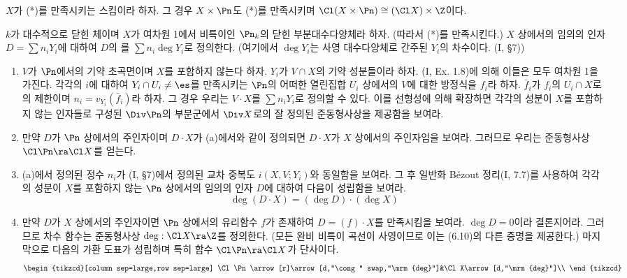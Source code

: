 	\begin{enumerate}[label=\tb{6.\arabic*.},itemindent=0mm,itemsep=2mm]
	\item $X$가 (*)를 만족시키는 스킴이라 하자. 그 경우 $X\times\Pn$도 (*)를 만족시키며 $\Cl(X\times\Pn)\cong(\Cl X)\times\Z$이다.
	{\renewcommand{\labelenumi}{\tb{*6.\arabic{enumi}.}}
	\item {} $k$가 대수적으로 닫힌 체이며
	$X$가 여차원 1에서 비특이인 $\Pn_k$의 닫힌 부분대수다양체라 하자. (따라서 (*)를 만족시킨다.)
	$X$ 상에서의 임의의 인자 $D=\sum n_iY_i$에 대하여 $D$의 를 $\sum n_i\deg Y_i$로 정의한다.
	(여기에서 $\deg Y_i$는 사영 대수다양체로 간주된 $Y_i$의 차수이다. (I, \S 7))
	\begin{enumerate}[label=(\alph*)]
	\item $V$가 $\Pn$에서의 기약 초곡면이며 $X$를 포함하지 않는다 하자. $Y_i$가 $V\cap X$의 기약 성분들이라 하자.
	(I, Ex. 1.8)에 의해 이들은 모두 여차원 1을 가진다.
	각각의 $i$에 대하여 $Y_i\cap U_i\ne\es$를 만족시키는 $\Pn$의 어떠한 열린집합 $U_i$ 상에서의 $V$에 대한 방정식을 $f_i$라 하자.
	$\bar f_i$가 $f_i$의 $U_i\cap X$로의 제한이며 $n_i=v_{Y_i}(\bar f_i)$라 하자.
	그 경우 우리는  $V\cdot X$를 $\sum n_iY_i$로 정의할 수 있다.
	이를 선형성에 의해 확장하면 각각의 성분이 $X$를 포함하지 않는 인자들로 구성된 $\Div\Pn$의 부분군에서
	$\Div X$로의 잘 정의된 준동형사상을 제공함을 보여라.
	\item 만약 $D$가 $\Pn$ 상에서의 주인자이며 $D\cdot X$가 (a)에서와 같이 정의되면 $D\cdot X$가 $X$ 상에서의 주인자임을 보여라.
	그러므로 우리는 준동형사상 $\Cl\Pn\ra\Cl X$를 얻는다.
	\item (a)에서 정의된 정수 $n_i$가 (I, \S7)에서 정의된 교차 중복도 $i(X,V;Y_i)$와 동일함을 보여라.
	그 후 일반화 B\'ezout 정리(I, 7.7)를 사용하여
	각각의 성분이 $X$를 포함하지 않는 $\Pn$ 상에서의 임의의 인자 $D$에 대하여 다음이 성립함을 보여라.
	$$\deg(D\cdot X)=(\deg D)\cdot(\deg X)$$
	\item 만약 $D$가 $X$ 상에서의 주인자이면 $\Pn$ 상에서의 유리함수 $f$가 존재하여 $D=(f)\cdot X$를 만족시킴을 보여라.
	$\deg D=0$이라 결론지어라. 그러므로 차수 함수는 준동형사상 $\deg:\Cl X\ra\Z$를 정의한다.
	(모든 완비 비특이 곡선이 사영이므로 이는 (6.10)의 다른 증명을 제공한다.)
	마지막으로 다음의 가환 도표가 성립하며 특히 함수 $\Cl\Pn\ra\Cl X$가 단사이다.
	$$\begin{tikzcd}[column sep=large,row sep=large]
	\Cl\Pn\arrow[r]\arrow[d,"\cong" swap,"\mrm{deg}"]&\Cl X\arrow[d,"\mrm{deg}"]\\

\end{tikzcd}$$
\end{enumerate}}
\end{enumerate}
